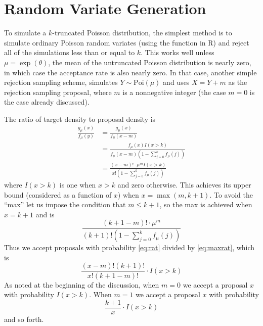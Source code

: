 \documentclass[11pt]{article}
\begin{document}
\section{Random Variate Generation}

To simulate a $k$-truncated Poisson distribution, the simplest method is to simulate
ordinary Poisson random variates (using the \verb@rpois@ function in R) and reject all
of the simulations less than or equal to $k$.
This works well unless $\mu = \exp(\theta)$, the mean of the untruncated Poisson distribution
is nearly zero, in which case the acceptance rate is also nearly zero.
In that case, another simple rejection sampling scheme, simulates $Y \sim \text{Poi}(\mu)$
and uses $X = Y + m$ as the rejection sampling proposal, where $m$ is a nonnegative integer
(the case $m = 0$ is the case already discussed).

The ratio of target density to proposal density is
\begin{equation} \label{eq:rat}
\begin{split}
   \frac{g_\mu(x)}{f_\mu(y)}
   & =
   \frac{g_\mu(x)}{f_\mu(x - m)}
   \\
   & =
   \frac{f_\mu(x) I(x > k)}{ f_\mu(x - m) \left( 1 - \sum_{j = 0}^k f_\mu(j) \right)}
   \\
   & =
   \frac{(x - m) ! \cdot \mu^m I(x > k)}{ x ! \left( 1 - \sum_{j = 0}^k f_\mu(j) \right)}
\end{split}
\end{equation}
where $I(x > k)$ is one when $x > k$ and zero otherwise.
This achieves its upper bound (considered as a function of $x$) when $x = \max(m, k + 1)$.
To avoid the ``max'' let us impose the condition that $m \le k + 1$, so the max is achieved
when $x = k + 1$ and is
\begin{equation} \label{eq:maxrat}
   \frac{(k + 1 - m) ! \cdot \mu^m}{ (k + 1) ! \left( 1 - \sum_{j = 0}^k f_\mu(j) \right)}
\end{equation}
Thus we accept proposals with probability \eqref{eq:rat} divided by \eqref{eq:maxrat},
which is
\begin{equation} \label{eq:accept-prob}
   \frac{(x - m) ! (k + 1) !}{ x ! (k + 1 - m) !} \cdot I(x > k)
\end{equation}
As noted at the beginning of the discussion, when $m = 0$ we accept a proposal $x$ with
probability $I(x > k)$.
When $m = 1$ we accept a proposal $x$ with probability
$$
   \frac{k + 1}{x} \cdot I(x > k)
$$
and so forth.
\end{document}
